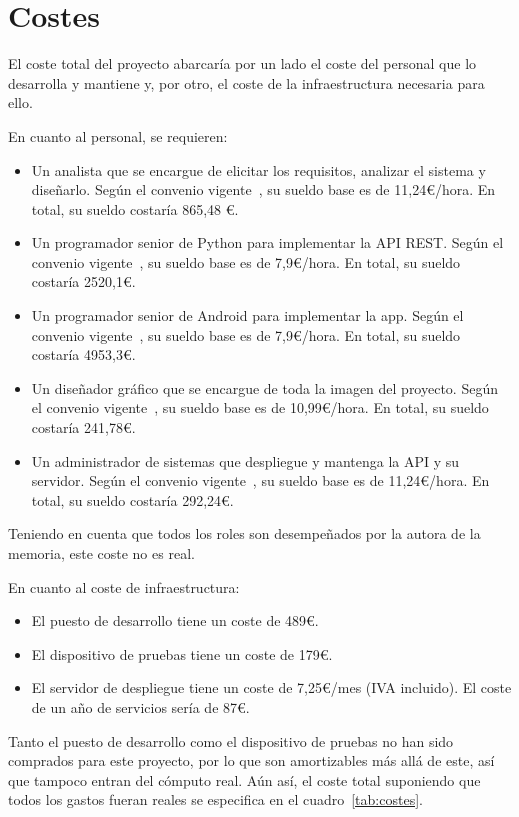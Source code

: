 \section{Costes}
\label{sec:costes}

El coste total del proyecto abarcaría por un lado el coste del personal que
lo desarrolla y mantiene y, por otro, el coste de la infraestructura necesaria
para ello.

En cuanto al personal, se requieren:
\begin{itemize}
\item Un analista que se encargue de elicitar los requisitos, analizar el
  sistema y diseñarlo. Según el convenio vigente~\cite{convenio}, su sueldo base
  es de 11,24€/hora. En total, su sueldo costaría 865,48 €.
\item Un programador senior de Python para implementar la API REST. Según el
  convenio vigente~\cite{convenio}, su sueldo base es de 7,9€/hora. En total, su
  sueldo costaría 2520,1€.
\item Un programador senior de Android para implementar la app. Según el
  convenio vigente~\cite{convenio}, su sueldo base es de 7,9€/hora. En total, su
  sueldo costaría 4953,3€.
\item Un diseñador gráfico que se encargue de toda la imagen del proyecto. Según
  el convenio vigente~\cite{convenio}, su sueldo base es de 10,99€/hora. En
  total, su sueldo costaría 241,78€.
\item Un administrador de sistemas que despliegue y mantenga la API y su
  servidor. Según el convenio vigente~\cite{convenio}, su sueldo base es de
  11,24€/hora. En total, su sueldo costaría 292,24€.
\end{itemize}

Teniendo en cuenta que todos los roles son desempeñados por la autora de la
memoria, este coste no es real.

En cuanto al coste de infraestructura:
\begin{itemize}
\item El puesto de desarrollo tiene un coste de 489€.
\item El dispositivo de pruebas tiene un coste de 179€.
\item El servidor de despliegue tiene un coste de 7,25€/mes (IVA incluido). El
  coste de un año de servicios sería de 87€.
\end{itemize}

Tanto el puesto de desarrollo como el dispositivo de pruebas no han sido
comprados para este proyecto, por lo que son amortizables más allá de este, así
que tampoco entran del cómputo real. Aún así, el coste total suponiendo que todos
los gastos fueran reales se especifica en el cuadro~\ref{tab:costes}.

